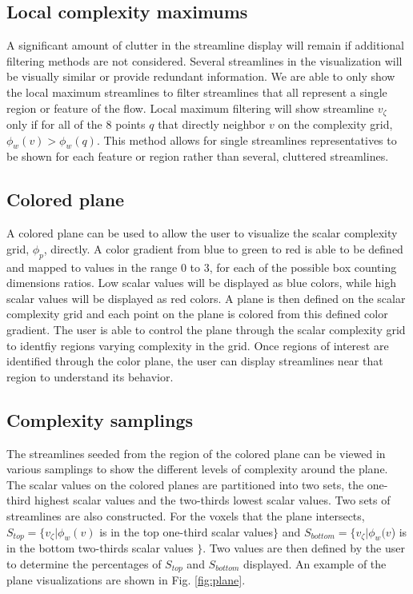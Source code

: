 \documentclass[journal]{vgtc}                %
\begin{document}
\subsection{Local complexity maximums}
A significant amount of clutter in the streamline display will remain if additional filtering methods are not considered.
Several streamlines in the visualization will be visually similar or provide redundant information.
We are able to only show the local maximum streamlines to filter streamlines that all represent a single region or feature of the flow.
Local maximum filtering will show streamline $v_\zeta$ only if for all of the 8 points $q$ that directly neighbor $v$ on the complexity grid, $\phi_w(v) > \phi_w(q)$.
This method allows for single streamlines representatives to be shown for each feature or region rather than several, cluttered streamlines.

\subsection{Colored plane}
A colored plane can be used to allow the user to visualize the scalar complexity grid, $\phi_p$, directly.
A color gradient from blue to green to red is able to be defined and mapped to values in the range 0 to 3, for each of the possible box counting dimensions ratios.
Low scalar values will be displayed as blue colors, while high scalar values will be displayed as red colors.
A plane is then defined on the scalar complexity grid and each point on the plane is colored from this defined color gradient.
The user is able to control the plane through the scalar complexity grid to identfiy regions varying complexity in the grid.
Once regions of interest are identified through the color plane, the user can display streamlines near that region to understand its behavior.

\subsection{Complexity samplings}
The streamlines seeded from the region of the colored plane can be viewed in various samplings to show the different levels of complexity around the plane.
The scalar values on the colored planes are partitioned into two sets, the one-third highest scalar values and the two-thirds lowest scalar values.
Two sets of streamlines are also constructed.
For the voxels that the plane intersects, $S_{top} = \{ v_\zeta | \phi_w(v)$ is in the top one-third scalar values$\}$ and $S_{bottom} = \{ v_\zeta | \phi_w(v$) is in the bottom two-thirds scalar values $\}$.
Two values are then defined by the user to determine the percentages of $S_{top}$ and $S_{bottom}$ displayed.
An example of the plane visualizations are shown in Fig. \ref{fig:plane}.
\end{document}
